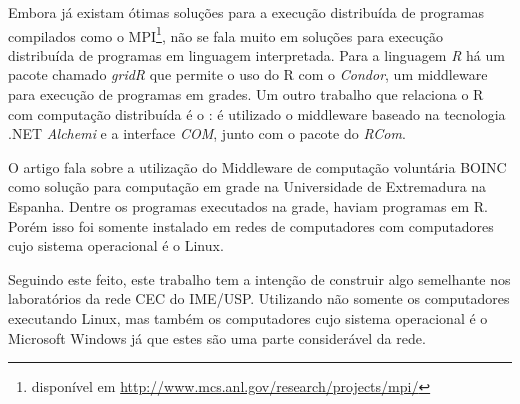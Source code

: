 Embora já existam ótimas soluções para a execução distribuída de programas compilados como o
 MPI\footnote{disponível em \url{http://www.mcs.anl.gov/research/projects/mpi/}}, não se fala muito em soluções 
para execução distribuída de programas em linguagem interpretada. 
Para a linguagem \emph{R} há um pacote chamado \emph{gridR} que permite o uso do R com o \emph{Condor}, %
um middleware para execução de programas em grades.  
Um outro trabalho que relaciona o R com computação distribuída é o \cite{Dias}: 
é utilizado o middleware baseado na tecnologia .NET \emph{Alchemi} e a interface \textit{COM}, junto com o pacote do 
\emph{RCom}.  


O artigo \cite{boinc} fala sobre a utilização do Middleware de computação voluntária BOINC como solução para computação 
em grade na Universidade de Extremadura na Espanha. Dentre os programas executados na grade, haviam
programas em R. Porém isso foi somente instalado em redes de computadores com computadores cujo sistema
operacional é o Linux. 

Seguindo este feito, este trabalho tem a intenção de construir algo semelhante nos laboratórios da rede CEC do IME/USP. Utilizando
não somente os computadores executando Linux, mas também os computadores cujo sistema operacional é o Microsoft Windows %
já que estes são uma parte considerável da rede.  



